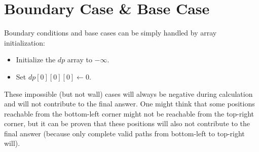 \documentclass[11pt, a4paper, oneside]{memoir}
\begin{document}
\section{Boundary Case \& Base Case}
Boundary conditions and base cases can be simply handled by array initialization:
\begin{itemize}
    \item Initialize the $dp$ array to $-\infty$.
    \item Set $dp[0][0][0] \gets 0$.
\end{itemize}
These impossible (but not wall) cases will always be negative during calculation and will not contribute to the final answer.
One might think that some positions reachable from the bottom-left corner might not be reachable from the top-right corner,
but it can be proven that these positions will also not contribute to the final answer (because only complete valid paths from bottom-left to top-right will).

\label{LastPage}
\end{document}
